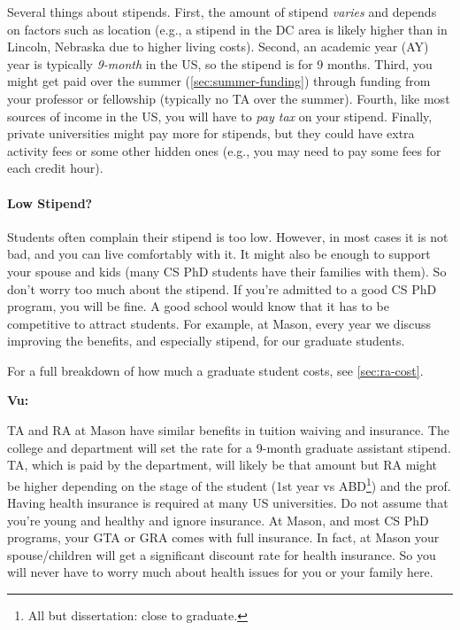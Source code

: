 \documentclass[oneside,11pt,dvipsnames]{book}
\newenvironment{commentbox}[1][]{
  \small
  \begin{mybox}
    {\small \textbf{#1}}
  }{
  \end{mybox}
}
\begin{document}
Several things about stipends.  First, the amount of stipend \emph{varies} and depends on factors such as location (e.g., a stipend in the DC area is likely higher than in Lincoln, Nebraska due to higher living costs). Second, an academic year (AY)  year is typically \emph{9-month} in the US, so the stipend is for 9 months. Third, you might get paid over the summer (\autoref{sec:summer-funding}) through funding from your professor or fellowship (typically no TA over the summer). Fourth, like most sources of income in the US, you will have to \emph{pay tax} on your stipend.  Finally, private universities might pay more for stipends, but they could have extra activity fees or some other hidden ones (e.g., you may need to pay some fees for each credit hour).

\paragraph{Low Stipend?} Students often complain their stipend is too low. However, in most cases it is not bad, and you can live comfortably with it.  It might also be enough to support your spouse and kids (many CS PhD students have their families with them). So don't worry too much about the stipend.  If you're admitted to a good CS PhD program, you will be fine. A good school would know that it has to be competitive to attract students.  For example, at Mason, every year we discuss improving the benefits, and especially stipend, for our graduate students.

For a full breakdown of how much a graduate student costs, see \autoref{sec:ra-cost}.

\begin{commentbox}[Vu:]
  TA and RA at Mason have similar benefits in tuition waiving and insurance.  The college and department will set the rate for a 9-month graduate assistant stipend.  TA, which is paid by the department, will likely be that amount but RA might be higher depending on the stage of the student (1st year vs ABD\footnote{All but dissertation: close to graduate.}) and the prof.
  \tcblower
  Having health insurance is required at many US universities.  Do not assume that you're young and healthy and ignore insurance.  At Mason, and most CS PhD programs, your GTA or GRA comes with full insurance. In fact, at Mason your spouse/children will get a significant discount rate for health insurance.  So you will never have to worry much about health issues for you or your family here.
\end{commentbox}
\end{document}
